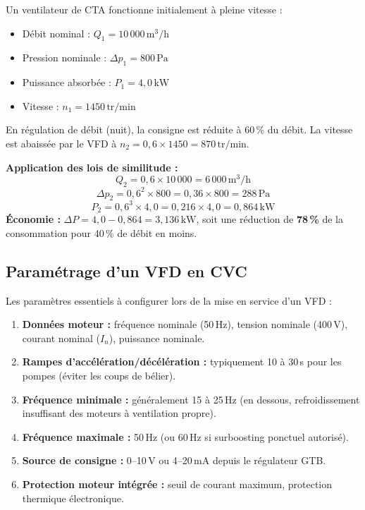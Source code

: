 \begin{exemple}[title={VFD sur ventilateur de centrale de traitement d'air (CTA)}]
  Un ventilateur de CTA fonctionne initialement à pleine vitesse :
  \begin{itemize}
    \item Débit nominal : $Q_1 = 10\,000\,\text{m}^3/\text{h}$
    \item Pression nominale : $\Delta p_1 = 800\,\text{Pa}$
    \item Puissance absorbée : $P_1 = 4{,}0\,\text{kW}$
    \item Vitesse : $n_1 = 1450\,\text{tr/min}$
  \end{itemize}
  En régulation de débit (nuit), la consigne est réduite à 60\,\% du débit. La vitesse est abaissée par le VFD à $n_2 = 0{,}6 \times 1450 = 870\,\text{tr/min}$.

  \textbf{Application des lois de similitude :}
  \[
    Q_2 = 0{,}6 \times 10\,000 = 6\,000\,\text{m}^3/\text{h}
  \]
  \[
    \Delta p_2 = 0{,}6^2 \times 800 = 0{,}36 \times 800 = 288\,\text{Pa}
  \]
  \[
    P_2 = 0{,}6^3 \times 4{,}0 = 0{,}216 \times 4{,}0 = 0{,}864\,\text{kW}
  \]
  \textbf{Économie :} $\Delta P = 4{,}0 - 0{,}864 = 3{,}136\,\text{kW}$, soit une réduction de \textbf{78\,\%} de la consommation pour 40\,\% de débit en moins.
\end{exemple}

\subsection{Paramétrage d'un VFD en CVC}

Les paramètres essentiels à configurer lors de la mise en service d'un VFD :

\begin{methode}
  \begin{enumerate}
    \item \textbf{Données moteur :} fréquence nominale (50\,Hz), tension nominale (400\,V), courant nominal ($I_n$), puissance nominale.
    \item \textbf{Rampes d'accélération/décélération :} typiquement 10 à 30\,s pour les pompes (éviter les coups de bélier).
    \item \textbf{Fréquence minimale :} généralement 15 à 25\,Hz (en dessous, refroidissement insuffisant des moteurs à ventilation propre).
    \item \textbf{Fréquence maximale :} 50\,Hz (ou 60\,Hz si surboosting ponctuel autorisé).
    \item \textbf{Source de consigne :} 0–10\,V ou 4–20\,mA depuis le régulateur GTB.
    \item \textbf{Protection moteur intégrée :} seuil de courant maximum, protection thermique électronique.
  \end{enumerate}
\end{methode}

